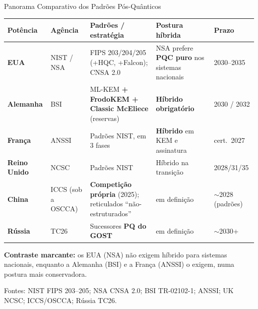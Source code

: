 \documentclass{beamer}
\begin{document}
\begin{frame}{Panorama Comparativo dos Padrões Pós-Quânticos}
    \begin{center}
    \renewcommand{\arraystretch}{1.35}
    \tiny
    \begin{tabularx}{\linewidth}{@{}l l >{\raggedright\arraybackslash}X >{\raggedright\arraybackslash}X l@{}}
        \toprule
        \textbf{Potência} & \textbf{Agência} & \textbf{Padrões / estratégia} & \textbf{Postura híbrida} & \textbf{Prazo} \\
        \midrule
        \rowcolor{blue!7} \textbf{EUA} & NIST / NSA & FIPS 203/204/205 (+HQC, +Falcon); CNSA 2.0 & NSA prefere \textbf{PQC puro} nos sistemas nacionais & 2030--2035 \\
        \textbf{Alemanha} & BSI & ML-KEM \textbf{+ FrodoKEM + Classic McEliece} (reservas) & \textbf{Híbrido obrigatório} & 2030 / 2032 \\
        \rowcolor{green!7} \textbf{França} & ANSSI & Padrões NIST, em 3 fases & \textbf{Híbrido} em KEM e assinatura & cert.\ 2027 \\
        \textbf{Reino Unido} & NCSC & Padrões NIST & Híbrido na transição & 2028/31/35 \\
        \rowcolor{red!7} \textbf{China} & ICCS (sob a OSCCA) & \textbf{Competição própria} (2025); reticulados ``não-estruturados'' & em definição & $\sim$2028 (padrões) \\
        \textbf{Rússia} & TC26 & Sucessores \textbf{PQ do GOST} & em definição & $\sim$2030+ \\
        \bottomrule
    \end{tabularx}
    \end{center}
    \vspace{-0.2em}
    \begin{tcolorbox}[colback=gray!8,colframe=gray!60!black,boxrule=0.5pt]
        \footnotesize
        \textbf{Contraste marcante:} os EUA (NSA) não exigem híbrido para sistemas nacionais, enquanto a Alemanha (BSI) e a França (ANSSI) o exigem, numa postura mais conservadora.
    \end{tcolorbox}
    \smallskip
    {\tiny Fontes: NIST FIPS 203--205; NSA CNSA 2.0; BSI TR-02102-1; ANSSI; UK NCSC; ICCS/OSCCA; Rússia TC26.}
\end{frame}
\end{document}
